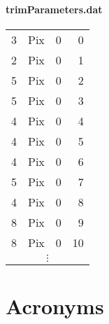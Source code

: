 \documentclass[british,11pt,a4paper]{memoir}
\begin{document}
\subsubsection{trimParameters.dat}
\ubuntu
\begin{tabular}{lllr}
\hline
3	&	Pix	&	0	&	0	\\
2	&	Pix	&	0	&	1	\\
5	&	Pix	&	0	&	2	\\
5	&	Pix	&	0	&	3	\\
4	&	Pix	&	0	&	4	\\
4	&	Pix	&	0	&	5	\\
4	&	Pix	&	0	&	6	\\
5	&	Pix	&	0	&	7	\\
4	&	Pix	&	0	&	8	\\
8	&	Pix	&	0	&	9	\\
8	&	Pix	&	0	&	10	\\
\multicolumn{4}{c}{$\vdots$}\\
\hline
\end{tabular}
\chapter{Acronyms}


% 
\end{document}

